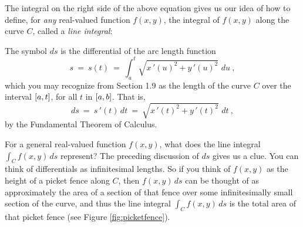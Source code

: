 The integral on the right side of the above equation gives us our idea of how to define, for \emph{any}
real-valued function $f(x,y)$, the integral of $f(x,y)$ along the curve $C$, called a \emph{line integral}:


The symbol $ds$ is the differential of the arc length function
\begin{equation}\label{eqn:arclen2}
 s ~=~ s(t) ~=~ \int_a^t \sqrt{x\,'(u)^2 + y\,'(u)^2}\,\,du ~,
\end{equation}
which you may recognize from Section 1.9 as the length of the curve $C$ over the interval $\lbrack a,t \rbrack$, for all
$t$ in $\lbrack a,b \rbrack$. That is,
\begin{equation}
 ds ~=~ s\,'(t)\,dt ~=~ \sqrt{x\,'(t)^2 + y\,'(t)^2}\,\,dt ~,
\end{equation}
by the Fundamental Theorem of Calculus.

For a general real-valued function $f(x,y)$, what does the line integral $\int_C f(x,y)\,ds$ represent? The preceding
discussion of $ds$ gives us a clue. You can think of differentials as infinitesimal lengths. So if you think
of $f(x,y)$ as the height of a picket fence along $C$, then $f(x,y)\,ds$ can be thought of as approximately the area of
a section of that fence over some infinitesimally small section of the curve, and thus the line integral
$\int_C f(x,y)\,ds$ is the total area of that picket fence (see Figure \ref{fig:picketfence}).\vspace{-1mm}

